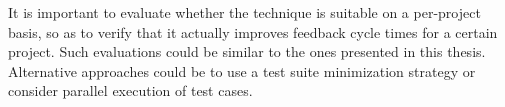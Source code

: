 \documentclass[a4paper,english,12pt]{report}
\begin{document}
It is important to evaluate whether the technique is suitable on a per-project basis, so as to verify that it actually improves feedback cycle times for a certain project.  Such evaluations could be similar to the ones presented in this thesis. Alternative approaches could be to use a test suite minimization strategy or consider parallel execution of test cases.

\cleardoublepage{}
{}



\begin{appendices}
  
  
\end{appendices}


\end{document}
